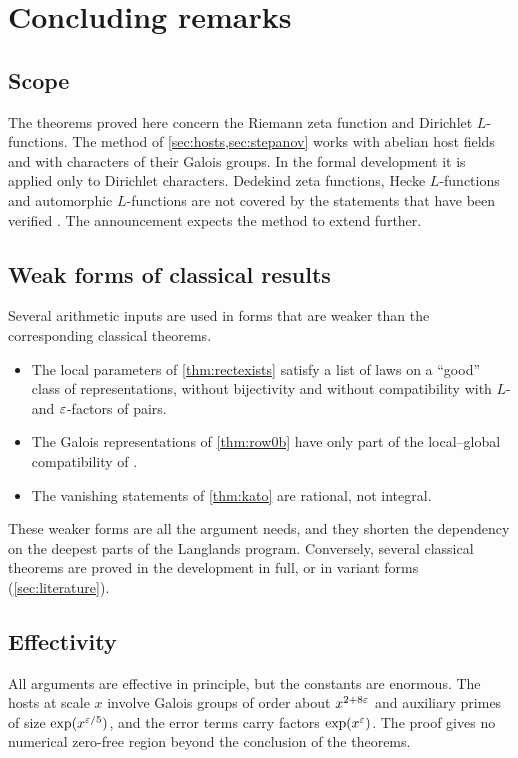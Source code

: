 \section{Concluding remarks}\label{sec:remarks}

\subsection{Scope}
The theorems proved here concern the Riemann zeta function and Dirichlet $L$-functions. The method of
\cref{sec:hosts,sec:stepanov} works with abelian host fields and with characters of their Galois
groups. In the formal development it is applied only to Dirichlet characters. Dedekind zeta functions,
Hecke $L$-functions and automorphic $L$-functions are not covered by the statements that have been
verified \cite{Sutherland2026}. The announcement \cite{Announcement2026} expects the method to extend
further.

\subsection{Weak forms of classical results}
Several arithmetic inputs are used in forms that are weaker than the corresponding classical theorems.
\begin{itemize}
\item The local parameters of \cref{thm:rectexists} satisfy a list of laws on a ``good'' class of
representations, without bijectivity and without compatibility with $L$- and $\varepsilon$-factors of pairs.
\item The Galois representations of \cref{thm:row0b} have only part of the local--global compatibility
of \cite{BarnetLambEtAl2014}.
\item The vanishing statements of \cref{thm:kato} are rational, not integral.
\end{itemize}
These weaker forms are all the argument needs, and they shorten the dependency on the deepest parts of
the Langlands program. Conversely, several classical theorems are proved in the development in full,
or in variant forms (\cref{sec:literature}).

\subsection{Effectivity}
All arguments are effective in principle, but the constants are enormous. The hosts at scale $x$
involve Galois groups of order about $x^{2+8\varepsilon}$ and auxiliary primes of size $\exp(x^{\varepsilon/5})$, and
the error terms carry factors $\exp(x^{\varepsilon})$. The proof gives no numerical zero-free region beyond
the conclusion of the theorems.

